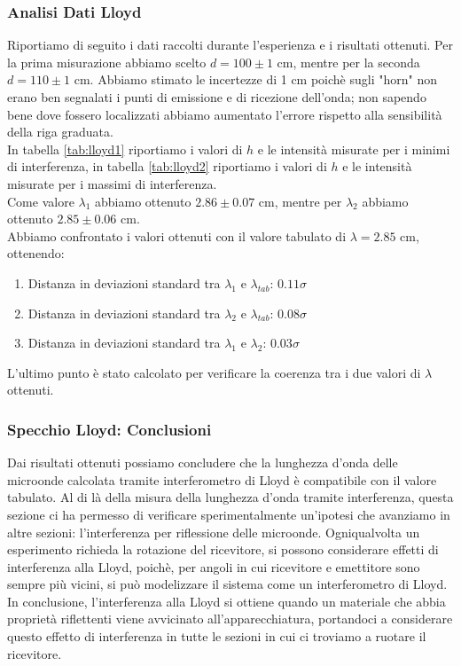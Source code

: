\documentclass[letterpaper,12pt]{article}
\begin{document}
\subsubsection{Analisi Dati Lloyd}
Riportiamo di seguito i dati raccolti durante l'esperienza e i risultati ottenuti.
Per la prima misurazione abbiamo scelto $d = 100 \pm 1$ cm, mentre per la seconda $d = 110 \pm 1$ cm. Abbiamo stimato
le incertezze di 1 cm poichè sugli "horn" non erano ben segnalati i punti di emissione e di ricezione
dell'onda; non sapendo bene dove fossero localizzati abbiamo aumentato l'errore rispetto alla sensibilità della riga
graduata.\\
In tabella \ref{tab:lloyd1} riportiamo i valori di $h$ e le intensità misurate per i minimi di interferenza, 
in tabella \ref{tab:lloyd2} riportiamo i valori di $h$ e le intensità misurate per i massimi di interferenza.\\
Come valore $\lambda_1$ abbiamo ottenuto $2.86 \pm 0.07$ cm, mentre per $\lambda_2$ abbiamo ottenuto $2.85 \pm 0.06$ cm.\\
Abbiamo confrontato i valori ottenuti con il valore tabulato di $\lambda = 2.85$ cm, ottenendo:
\begin{enumerate}
    \item Distanza in deviazioni standard tra $\lambda_1$ e $\lambda_{tab}$: $0.11 \sigma$
    \item Distanza in deviazioni standard tra $\lambda_2$ e $\lambda_{tab}$: $0.08 \sigma$
    \item Distanza in deviazioni standard tra $\lambda_1$ e $\lambda_2$: $0.03 \sigma$
\end{enumerate}
L'ultimo punto è stato calcolato per verificare la coerenza tra i due valori di $\lambda$ ottenuti.\\

\subsubsection{Specchio Lloyd: Conclusioni}
Dai risultati ottenuti possiamo concludere che la lunghezza d'onda delle microonde calcolata tramite interferometro 
di Lloyd è compatibile con il valore tabulato. 
Al di là della misura della lunghezza d'onda tramite interferenza, questa sezione ci ha permesso di verificare
sperimentalmente un'ipotesi che avanziamo in altre sezioni: l'interferenza per riflessione delle microonde. Ogniqualvolta
un esperimento richieda la rotazione del ricevitore, si possono considerare effetti di interferenza alla Lloyd,
poichè, per angoli in cui ricevitore e emettitore sono sempre più vicini, si può modelizzare il sistema come 
un interferometro di Lloyd.\\
In conclusione, l'interferenza alla Lloyd si ottiene quando un materiale che abbia proprietà riflettenti viene
avvicinato all'apparecchiatura, portandoci a considerare questo effetto di interferenza in tutte le sezioni in cui 
ci troviamo a ruotare il ricevitore.\\
\end{document}
